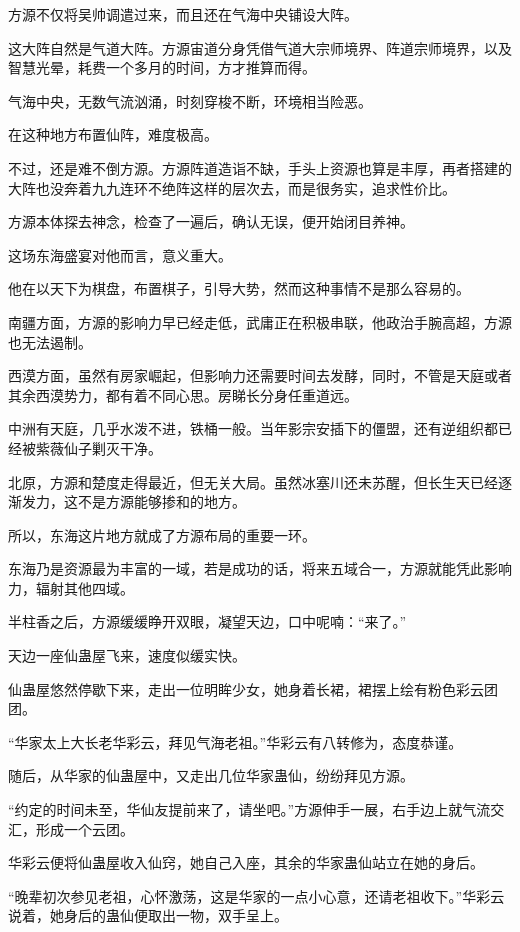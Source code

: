 \begin{this_body}
方源不仅将吴帅调遣过来，而且还在气海中央铺设大阵。

这大阵自然是气道大阵。方源宙道分身凭借气道大宗师境界、阵道宗师境界，以及智慧光晕，耗费一个多月的时间，方才推算而得。

气海中央，无数气流汹涌，时刻穿梭不断，环境相当险恶。

在这种地方布置仙阵，难度极高。

不过，还是难不倒方源。方源阵道造诣不缺，手头上资源也算是丰厚，再者搭建的大阵也没奔着九九连环不绝阵这样的层次去，而是很务实，追求性价比。

方源本体探去神念，检查了一遍后，确认无误，便开始闭目养神。

这场东海盛宴对他而言，意义重大。

他在以天下为棋盘，布置棋子，引导大势，然而这种事情不是那么容易的。

南疆方面，方源的影响力早已经走低，武庸正在积极串联，他政治手腕高超，方源也无法遏制。

西漠方面，虽然有房家崛起，但影响力还需要时间去发酵，同时，不管是天庭或者其余西漠势力，都有着不同心思。房睇长分身任重道远。

中洲有天庭，几乎水泼不进，铁桶一般。当年影宗安插下的僵盟，还有逆组织都已经被紫薇仙子剿灭干净。

北原，方源和楚度走得最近，但无关大局。虽然冰塞川还未苏醒，但长生天已经逐渐发力，这不是方源能够掺和的地方。

所以，东海这片地方就成了方源布局的重要一环。

东海乃是资源最为丰富的一域，若是成功的话，将来五域合一，方源就能凭此影响力，辐射其他四域。

半柱香之后，方源缓缓睁开双眼，凝望天边，口中呢喃：“来了。”

天边一座仙蛊屋飞来，速度似缓实快。

仙蛊屋悠然停歇下来，走出一位明眸少女，她身着长裙，裙摆上绘有粉色彩云团团。

“华家太上大长老华彩云，拜见气海老祖。”华彩云有八转修为，态度恭谨。

随后，从华家的仙蛊屋中，又走出几位华家蛊仙，纷纷拜见方源。

“约定的时间未至，华仙友提前来了，请坐吧。”方源伸手一展，右手边上就气流交汇，形成一个云团。

华彩云便将仙蛊屋收入仙窍，她自己入座，其余的华家蛊仙站立在她的身后。

“晚辈初次参见老祖，心怀激荡，这是华家的一点小心意，还请老祖收下。”华彩云说着，她身后的蛊仙便取出一物，双手呈上。


\end{this_body}
